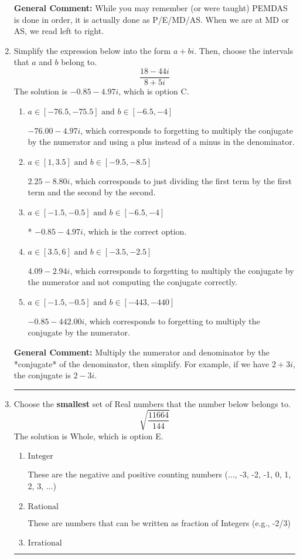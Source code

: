 \documentclass{extbook}[14pt]
\newcommand{\litem}[1]{\item #1

\rule{\textwidth}{0.4pt}}
\begin{document}
\begin{enumerate}
{\textbf{General Comment:} While you may remember (or were taught) PEMDAS is done in order, it is actually done as P/E/MD/AS. When we are at MD or AS, we read left to right.
}
\litem{
Simplify the expression below into the form $a+bi$. Then, choose the intervals that $a$ and $b$ belong to.
\[ \frac{18 - 44 i}{8 + 5 i} \]The solution is \( -0.85  - 4.97 i \), which is option C.\begin{enumerate}[label=\Alph*.]
\item \( a \in [-76.5, -75.5] \text{ and } b \in [-6.5, -4] \)

 $-76.00  - 4.97 i$, which corresponds to forgetting to multiply the conjugate by the numerator and using a plus instead of a minus in the denominator.
\item \( a \in [1, 3.5] \text{ and } b \in [-9.5, -8.5] \)

 $2.25  - 8.80 i$, which corresponds to just dividing the first term by the first term and the second by the second.
\item \( a \in [-1.5, -0.5] \text{ and } b \in [-6.5, -4] \)

* $-0.85  - 4.97 i$, which is the correct option.
\item \( a \in [3.5, 6] \text{ and } b \in [-3.5, -2.5] \)

 $4.09  - 2.94 i$, which corresponds to forgetting to multiply the conjugate by the numerator and not computing the conjugate correctly.
\item \( a \in [-1.5, -0.5] \text{ and } b \in [-443, -440] \)

 $-0.85  - 442.00 i$, which corresponds to forgetting to multiply the conjugate by the numerator.
\end{enumerate}

\textbf{General Comment:} Multiply the numerator and denominator by the *conjugate* of the denominator, then simplify. For example, if we have $2+3i$, the conjugate is $2-3i$.
}
\litem{
Choose the \textbf{smallest} set of Real numbers that the number below belongs to.
\[ \sqrt{\frac{11664}{144}} \]The solution is \( \text{Whole} \), which is option E.\begin{enumerate}[label=\Alph*.]
\item \( \text{Integer} \)

These are the negative and positive counting numbers (..., -3, -2, -1, 0, 1, 2, 3, ...)
\item \( \text{Rational} \)

These are numbers that can be written as fraction of Integers (e.g., -2/3)
\item \( \text{Irrational} \)


\end{enumerate}}
\end{enumerate}
\end{document}
